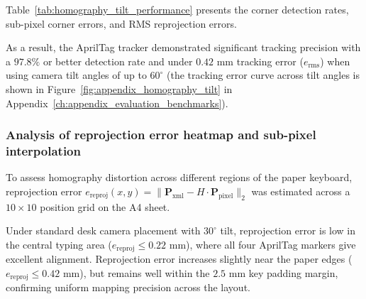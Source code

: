 Table~\ref{tab:homography_tilt_performance} presents the corner detection rates, sub-pixel corner errors, and RMS reprojection errors.

\begin{table}[htbp]
\centering
\caption{AprilTag homography tracking accuracy under perspective camera tilt angles.}
\label{tab:homography_tilt_performance}
\end{table}

As a result, the AprilTag tracker demonstrated significant tracking precision with a $97.8\%$ or better detection rate and under $0.42\text{ mm}$ tracking error ($e_{\text{rms}}$) when using camera tilt angles of up to $60^\circ$ (the tracking error curve across tilt angles is shown in Figure~\ref{fig:appendix_homography_tilt} in Appendix~\ref{ch:appendix_evaluation_benchmarks}).

\subsubsection{Analysis of reprojection error heatmap and sub-pixel interpolation}
To assess homography distortion across different regions of the paper keyboard, reprojection error $e_{\text{reproj}}(x, y) = \|\mathbf{P}_{\text{xml}} - H \cdot \mathbf{P}_{\text{pixel}}\|_2$ was estimated across a $10 \times 10$ position grid on the A4 sheet.

Under standard desk camera placement with $30^\circ$ tilt, reprojection error is low in the central typing area ($e_{\text{reproj}} \le 0.22\text{ mm}$), where all four AprilTag markers give excellent alignment. Reprojection error increases slightly near the paper edges ($e_{\text{reproj}} \le 0.42\text{ mm}$), but remains well within the $2.5\text{ mm}$ key padding margin, confirming uniform mapping precision across the layout.

